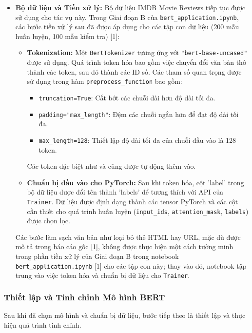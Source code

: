 \begin{itemize}
    \item \textbf{Bộ dữ liệu và Tiền xử lý:}
    Bộ dữ liệu IMDB Movie Reviews tiếp tục được sử dụng cho tác vụ này. Trong Giai đoạn B của \texttt{bert\_application.ipynb}, các bước tiền xử lý sau đã được áp dụng cho các tập con dữ liệu (200 mẫu huấn luyện, 100 mẫu kiểm tra) [1]:
    \begin{itemize}
        \item \textbf{Tokenization:} Một \texttt{BertTokenizer} tương ứng với \texttt{"bert-base-uncased"} được sử dụng. Quá trình token hóa bao gồm việc chuyển đổi văn bản thô thành các token, sau đó thành các ID số. Các tham số quan trọng được sử dụng trong hàm \texttt{preprocess\_function} bao gồm:
            \begin{itemize}
                \item \texttt{truncation=True}: Cắt bớt các chuỗi dài hơn độ dài tối đa.
                \item \texttt{padding="max\_length"}: Đệm các chuỗi ngắn hơn để đạt độ dài tối đa.
                \item \texttt{max\_length=128}: Thiết lập độ dài tối đa của chuỗi đầu vào là 128 token.
            \end{itemize}
            Các token đặc biệt như \texttt{} và \texttt{} cũng được tự động thêm vào.
        \item \textbf{Chuẩn bị đầu vào cho PyTorch:} Sau khi token hóa, cột 'label' trong bộ dữ liệu được đổi tên thành 'labels' để tương thích với API của \texttt{Trainer}. Dữ liệu được định dạng thành các tensor PyTorch và các cột cần thiết cho quá trình huấn luyện (\texttt{input\_ids}, \texttt{attention\_mask}, \texttt{labels}) được chọn lọc.
    \end{itemize}
    Các bước làm sạch văn bản như loại bỏ thẻ HTML hay URL, mặc dù được mô tả trong báo cáo gốc [1], không được thực hiện một cách tường minh trong phần tiền xử lý của Giai đoạn B trong notebook \texttt{bert\_application.ipynb} [1] cho các tập con này; thay vào đó, notebook tập trung vào việc token hóa và chuẩn bị dữ liệu cho \texttt{Trainer}.
\end{itemize}

\subsubsection{Thiết lập và Tinh chỉnh Mô hình BERT}
\label{sssec:thiet_lap_tinh_chinh_bert_rewrite}
Sau khi đã chọn mô hình và chuẩn bị dữ liệu, bước tiếp theo là thiết lập và thực hiện quá trình tinh chỉnh.

